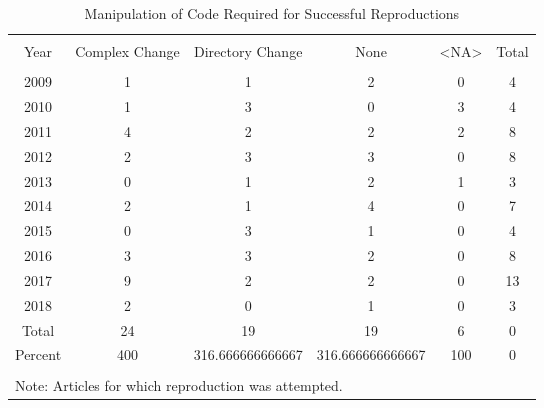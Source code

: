 
\begin{table}[!htbp] \centering 
  \caption{Manipulation of Code Required for Successful Reproductions} 
  \label{tab:code} 
\footnotesize 
\begin{tabular}{@{\extracolsep{0.4pt}} cccccc} 
\\[-1.8ex]\hline 
\hline \\[-1.8ex] 
Year & Complex Change & Directory Change & None & \textless NA\textgreater  & Total \\ 
\hline \\[-1.8ex] 
2009 & 1 & 1 & 2 & 0 & 4 \\ 
2010 & 1 & 3 & 0 & 3 & 4 \\ 
2011 & 4 & 2 & 2 & 2 & 8 \\ 
2012 & 2 & 3 & 3 & 0 & 8 \\ 
2013 & 0 & 1 & 2 & 1 & 3 \\ 
2014 & 2 & 1 & 4 & 0 & 7 \\ 
2015 & 0 & 3 & 1 & 0 & 4 \\ 
2016 & 3 & 3 & 2 & 0 & 8 \\ 
2017 & 9 & 2 & 2 & 0 & 13 \\ 
2018 & 2 & 0 & 1 & 0 & 3 \\ 
Total & 24 & 19 & 19 & 6 & 0 \\ 
Percent & 400 & 316.666666666667 & 316.666666666667 & 100 & 0 \\ 
\hline \\[-1.8ex] 
\multicolumn{6}{l}{Note: Articles for which reproduction was attempted.} \\ 
\end{tabular} 
\end{table} 
